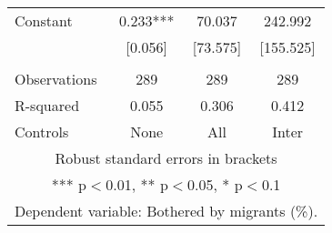 \begin{tabular}{lccc}
Constant & 0.233*** & 70.037 & 242.992 \\
 & [0.056] & [73.575] & [155.525] \\
 &  &  &  \\
Observations & 289 & 289 & 289 \\
R-squared & 0.055 & 0.306 & 0.412 \\
 Controls & None & All & Inter \\ \hline
\multicolumn{4}{c}{ Robust standard errors in brackets} \\
\multicolumn{4}{c}{ *** p$<$0.01, ** p$<$0.05, * p$<$0.1} \\
\multicolumn{4}{c}{ Dependent variable: Bothered by migrants (\%).} \\
\end{tabular}
